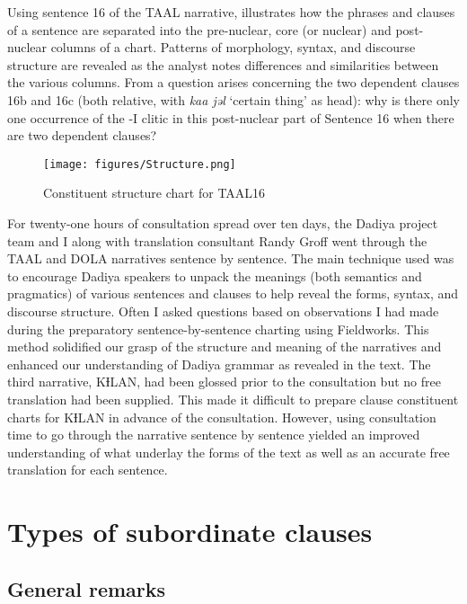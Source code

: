 \documentclass[output=paper]{langscibook}
\begin{document}
\noindent Using sentence 16 of the TAAL narrative,  illustrates how the phrases and clauses of a sentence are separated into the pre-nuclear, core (or nuclear) and post-nuclear columns of a chart. Patterns of morphology, syntax, and discourse structure are revealed as the analyst notes differences and similarities between the various columns. From  a question arises concerning the two dependent clauses 16b and 16c (both relative, with \textit{kaa jəl} `certain thing' as head): why is there only one occurrence of the -I clitic in this post-nuclear part of Sentence 16 when there are two dependent clauses?

\begin{figure}
    \texttt{[image: figures/Structure.png]}
    \caption{Constituent structure chart for TAAL16}
    \label{fig:dettweiler:StructureChart}
\end{figure}

For twenty-one hours of consultation spread over ten days, the Dadiya project team and I along with translation consultant Randy Groff went through the TAAL and DOLA narratives sentence by sentence. The main technique used was to encourage Dadiya speakers to unpack the meanings (both semantics and pragmatics) of various sentences and clauses to help reveal the forms, syntax, and discourse structure. Often I asked questions based on observations I had made during the preparatory sentence-by-sentence charting using Fieldworks. This method solidified our grasp of the structure and meaning of the narratives and enhanced our understanding of Dadiya grammar as revealed in the text.  The third narrative, KƗLAN, had been glossed prior to the consultation but no free translation had been supplied. This made it difficult to prepare clause constituent charts for KƗLAN in advance of the consultation. However, using consultation time to go through the narrative sentence by sentence yielded an improved understanding of what underlay the forms of the text as well as an accurate free translation for each sentence.

\section{Types of subordinate clauses}\label{sec:dettweiler:3}\largerpage

\subsection{General remarks}
\end{document}
